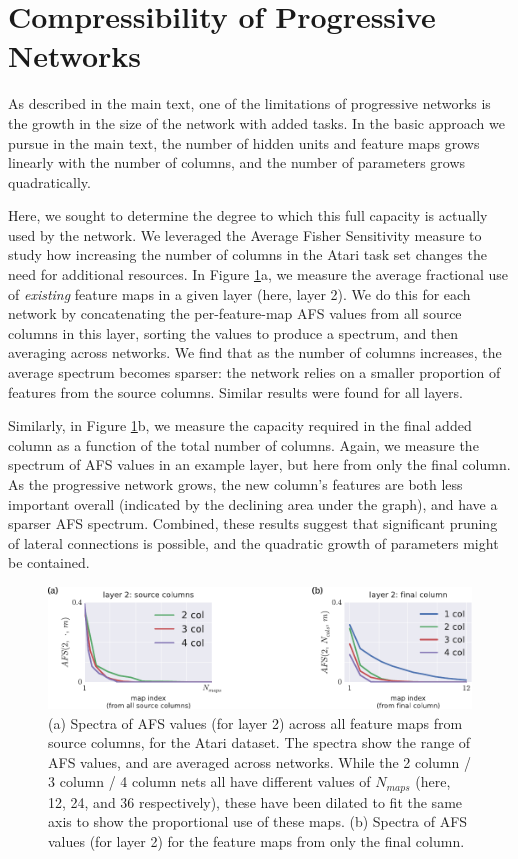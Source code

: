 \section{Compressibility of Progressive Networks}

As described in the main text, one of the limitations of progressive networks is the growth in the size of the network with added tasks. In the basic approach we pursue in the main text, the number of hidden units and feature maps grows linearly with the number of columns, and the number of parameters grows quadratically.

Here, we sought to determine the degree to which this full capacity is actually used by the network. We leveraged the Average Fisher Sensitivity measure to study how increasing the number of columns in the Atari task set changes the need for additional resources. In Figure \ref{fig:app_compression}a, we measure the average fractional use of \textit{existing} feature maps in a given layer (here, layer 2). We do this for each network by concatenating the per-feature-map AFS values from all source columns in this layer, sorting the values to produce a spectrum, and then averaging across networks. We find that as the number of columns increases, the average spectrum becomes sparser: the network relies on a smaller proportion of features from the source columns. Similar results were found for all layers. 

Similarly, in Figure \ref{fig:app_compression}b, we measure the capacity required in the final added column as a function of the total number of columns. Again, we measure the spectrum of AFS values in an example layer, but here from only the final column. As the progressive network grows, the new column's features are both less important overall (indicated by the declining area under the graph), and have a sparser AFS spectrum. Combined, these results suggest that significant pruning of lateral connections is possible, and the quadratic growth of parameters might be contained.

\begin{figure}[h]
  \centering
    \includegraphics[width=.95\textwidth]{figures/appendix_compression.pdf}
    \caption{(a) Spectra of AFS values (for layer 2) across all feature maps from source columns, for the Atari dataset. The spectra show the range of AFS values, and are averaged across networks. While the 2 column / 3 column / 4 column nets all have different values of $N_{maps}$ (here, 12, 24, and 36 respectively), these have been dilated to fit the same axis to show the proportional use of these maps. (b) Spectra of AFS values (for layer 2) for the feature maps from only the final column. 
      }
    \label{fig:app_compression}
\end{figure}

